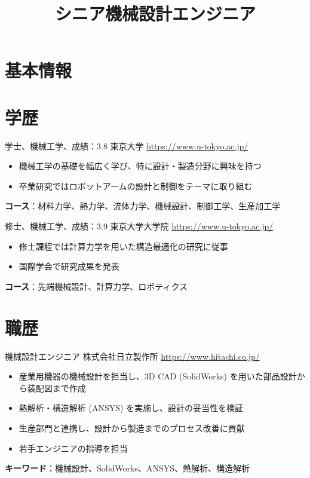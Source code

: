 \documentclass[a4paper, serif, 10pt]{moderncv}
\title{シニア機械設計エンジニア}
\begin{document}
\maketitle

\section{基本情報}

\section{学歴}

        {学士、機械工学、成績：3.8}
        {東京大学}
        {\url{https://www.u-tokyo.ac.jp/}}
        {}
        {\begin{itemize}
\item 機械工学の基礎を幅広く学び、特に設計・製造分野に興味を持つ
\item 卒業研究ではロボットアームの設計と制御をテーマに取り組む
\end{itemize}
\textbf{コース}：材料力学、熱力学、流体力学、機械設計、制御工学、生産加工学}

        {修士、機械工学、成績：3.9}
        {東京大学大学院}
        {\url{https://www.u-tokyo.ac.jp/}}
        {}
        {\begin{itemize}
\item 修士課程では計算力学を用いた構造最適化の研究に従事
\item 国際学会で研究成果を発表
\end{itemize}
\textbf{コース}：先端機械設計、計算力学、ロボティクス}
\section{職歴}

        {機械設計エンジニア}
        {株式会社日立製作所}
        {\url{https://www.hitachi.co.jp/}}
        {}
        {\begin{itemize}
\item 産業用機器の機械設計を担当し、3D CAD (SolidWorks) を用いた部品設計から装配図まで作成
\item 熱解析・構造解析 (ANSYS) を実施し、設計の妥当性を検証
\item 生産部門と連携し、設計から製造までのプロセス改善に貢献
\item 若手エンジニアの指導を担当
\end{itemize}
\textbf{キーワード}：機械設計、SolidWorks、ANSYS、熱解析、構造解析}
\end{document}
